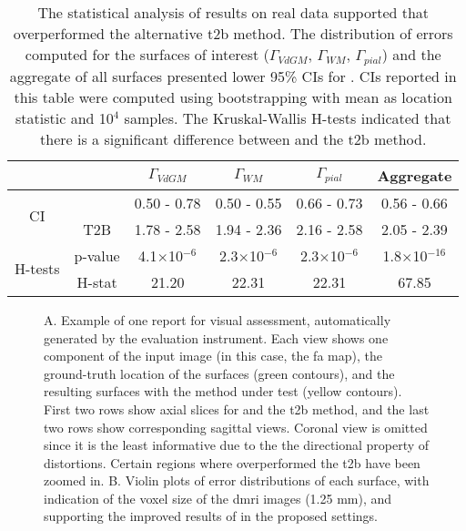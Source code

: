 \begin{table}
		\centering
		\footnotesize
		\tabcolsep=0.08cm
    \begin{tabular}{cccccc}
    & & $\Gamma_{VdGM}$  & $\Gamma_{WM}$ & $\Gamma_{pial}$ & Aggregate \\
    \hline
    \multirow{2}{*}{CI}
       & \regseg{}        & 0.50 - 0.78 & 0.50 - 0.55 & 0.66 - 0.73 & 0.56 - 0.66 \\
       & T2B                  & 1.78 - 2.58 & 1.94 - 2.36 & 2.16 - 2.58 & 2.05 - 2.39 \\
    \hline
    \multirow{2}{*}{H-tests}
       & p-value  & 4.1$\times$10$^{-6}$& 2.3$\times$10$^{-6}$& 2.3$\times$10$^{-6}$ & 1.8$\times$10$^{-16}$ \\
       & H-stat   & 21.20               & 22.31               & 22.31                & 67.85              \\
    \hline
    \end{tabular}
    \caption{The statistical analysis of results on real data supported that \regseg{} overperformed
    the alternative \acrfull{t2b} method.
    The distribution of errors computed for the surfaces of interest ($\Gamma_{VdGM}$, $\Gamma_{WM}$, $\Gamma_{pial}$)
      and the aggregate of all surfaces presented lower 95\% CIs for \regseg{}.
    CIs reported in this table were computed using bootstrapping with mean as location statistic and 10$^4$ samples.
    The Kruskal-Wallis H-tests indicated that there is a significant difference between \regseg{} and
      the \gls*{t2b} method.
    }\label{tab:results_real}
\end{table}

\begin{figure*}
  \centering
  
  \caption{A. Example of one report for visual assessment, automatically generated by the evaluation instrument.
    Each view shows one component of the input image (in this case, the \gls*{fa} map), the ground-truth location
    of the surfaces (green contours), and the resulting surfaces with the method under test (yellow contours).
  First two rows show axial slices for \regseg{} and the \acrfull*{t2b} method, and the last two rows
    show corresponding sagittal views.
  Coronal view is omitted since it is the least informative due to the the directional property
    of distortions.
  Certain regions where \regseg{} overperformed the \gls*{t2b} have been zoomed in.
  B. Violin plots of error distributions of each surface, with indication of the voxel size of the \gls*{dmri} images
    (1.25 mm), and supporting the improved results of \regseg{} in the proposed settings.
	}\label{fig:results_real}
\end{figure*}
